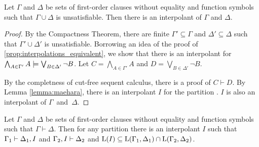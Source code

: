 \begin{thm}
	\label{thm:prop_interpol}
	Let $\Gamma$ and $\Delta$ be sets of first-order clauses without equality and function symbols such that $\Gamma \cup \Delta$ is unsatisfiable. Then there is an interpolant of $\Gamma$ and $\Delta$.
\end{thm}
\begin{proof}
	By the Compactness Theorem, there are finite $\Gamma' \subseteq \Gamma$ and $\Delta' \subseteq \Delta$ such that $\Gamma' \cup \Delta'$ is unsatisfiable.
	Borrowing an idea of the proof of \ref{prop:interpolations_equivalent},
	we show that there is an interpolant for $\bigwedge_{A\in \Gamma'}A \models \bigvee_{B \in \Delta'} \lnot B$.
	Let $C = \bigwedge_{A \in \Gamma'} A$ and $D = \bigvee_{B \in \Delta'} \lnot B$.

	By the completness of cut-free sequent calculus, there is a proof of $C \vdash D$.
	By Lemma \ref{lemma:maehara}, there is an interpolant $I$ for the partition . $I$ is also an interpolant of $\Gamma$~and~$\Delta$.

\end{proof}
\begin{lemma}[Maehara]
	\label{lemma:maehara}
Let $\Gamma$ and $\Delta$ be sets of first-order clauses without equality and function symbols such that $\Gamma \vdash \Delta$.
	Then for any partition 
	there is an interpolant $I$ such that $\Gamma_1 \vdash \Delta_1, I$ and $\Gamma_2, I \vdash \Delta_2$ and $\operatorname{L}(I) \subseteq \operatorname{L}(\Gamma_1, \Delta_1) \cap \operatorname{L}(\Gamma_2, \Delta_2)$.
\end{lemma}
